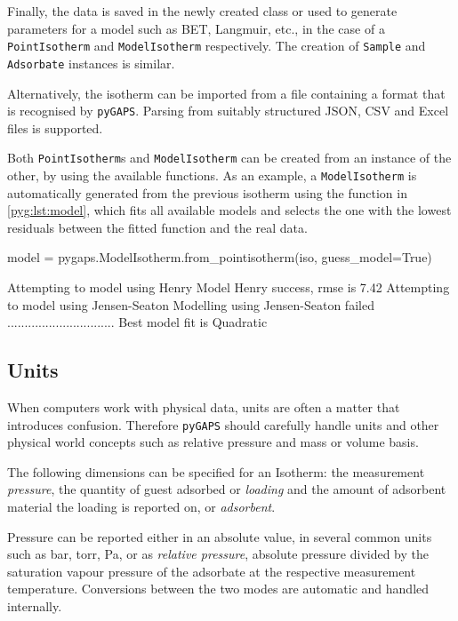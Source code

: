 Finally, the data is saved in the newly created class or used to
generate parameters for a model such as \gls{BET}, Langmuir, etc.,
in the case of a \texttt{PointIsotherm} and
\texttt{ModelIsotherm} respectively. The creation of
\texttt{Sample} and \texttt{Adsorbate} instances is similar.

Alternatively, the isotherm can be imported from a file containing 
a format that is recognised by \texttt{pyGAPS}. Parsing from 
suitably structured JSON, CSV and Excel files is supported.

Both \texttt{PointIsotherm}s and \texttt{ModelIsotherm} can
be created from an instance of the other, by using the 
available functions. As an example, a \texttt{ModelIsotherm} is automatically
generated from the previous isotherm using the function in
\autoref{pyg:lst:model}, which fits all available models and selects
the one with the lowest residuals between the fitted function
and the real data.

\begin{python}[caption={Guessing the best model},label={pyg:lst:model}]
model = pygaps.ModelIsotherm.from_pointisotherm(iso, guess_model=True)
\end{python}
\begin{pythonout}
Attempting to model using Henry
Model Henry success, rmse is 7.42
Attempting to model using Jensen-Seaton
Modelling using Jensen-Seaton failed
...............................
Best model fit is Quadratic
\end{pythonout}

\subsection{Units}

When computers work with physical data, units are often a matter 
that introduces confusion. Therefore \texttt{pyGAPS} should
carefully handle units and other physical world concepts such as relative
pressure and mass or volume basis.

The following dimensions can be specified for an Isotherm: 
the measurement \textit{pressure}, the quantity of guest adsorbed
or \textit{loading} and the amount of adsorbent material
the loading is reported on, or \textit{adsorbent}.

Pressure can be reported either in an absolute value, in several 
common units such as \si{\bar}, torr, \si{\pascal}, or as 
\textit{relative pressure}, absolute pressure divided by the 
saturation vapour pressure of the adsorbate at the respective
measurement temperature. Conversions between the two modes are 
automatic and handled internally.

